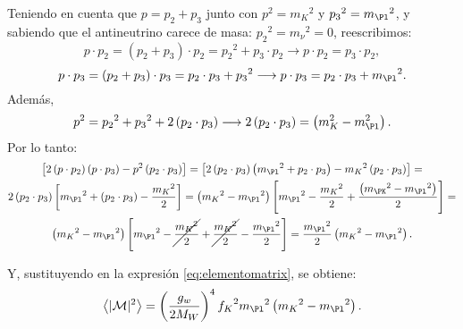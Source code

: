 Teniendo en cuenta que $p=p_{2}+p_{3}$ junto con $p^2={m_K}^2$ y ${p_3}^2={m_{\Pl}}^2$, y sabiendo que el antineutrino carece de masa: ${p_2}^2={m_{\nu}}^2=0$, reescribimos:
\begin{equation}
p \cdot p_{2} = \left( p_{2}+ p_{3}\right) \cdot p_{2} = {p_2}^{2}+ p_{3} \cdot p_{2} \longrightarrow p\cdot p_{2}= p_{3} \cdot p_{2} ,
\end{equation}
\begin{equation}
p \cdot p_{3}=\left( p_{2}+ p_{3}\right) \cdot p_{3} = p_{2} \cdot p_{3}+ {p_{3}}^2 \longrightarrow p \cdot p_{3} = p_{2} \cdot p_{3}+{m_{\Pl}}^2 .
\end{equation}
Además,
\begin{equation}
p^{2}={p_{2}}^{2}+{p_3}^{2}+2\left( p_{2} \cdot p_{3}\right) \longrightarrow 2\left( p_{2} \cdot p_{3}\right)=\left( m_{K}^{2}-m_{\Pl}^{2}\right) .
\end{equation}
Por lo tanto:
\begin{multline}
\left[ 2\left( p\cdot p_{2}\right) \left( p\cdot p_{3}\right) -p^{2}\left( p_{2}\cdot p_{3}\right) \right] = \left[ 2\left( p_{2}\cdot p_{3}\right) \left( {m_{\Pl}}^{2}+p_{2}\cdot p_{3}\right) -{m_{K}}^{2}\left( p_{2}\cdot p_{3}\right) \right] = \\ 2\left( p_{2} \cdot p_{3}\right) \left[ {m_{\Pl}}^{2}+\left( p_{2}\cdot p_{3}\right) -\dfrac{{m_K}^{2}}{2}\right] = \left({m_{K}}^{2}-{m_{\Pl}}^{2}\right) \left[{m_{\Pl}}^{2}-\dfrac{{m_K}^{2}}{2}+\dfrac{\left({m_{\PK}}^{2}-{m_{\Pl}}^{2}\right) }{2}\right] =\\ \left({m_{K}}^{2}-{m_{\Pl}}^{2}\right) \left[{m_{\Pl}}^{2}-\cancel{\dfrac{{m_{K}}^{2}}{2}}+\cancel{\dfrac{{m_{K}}^{2}}{2}}-\dfrac{{m_{\Pl}}^{2}}{2}\right] =\dfrac{{m_{\Pl}}^{2}}{2}\left( {m_{K}}^{2}-{m_{\Pl}}^{2}\right) .
\end{multline}

Y, sustituyendo en la expresión \ref{eq:elementomatrix}, se obtiene:
\begin{equation}
\left\langle |\mathcal{M}|^{2}\right\rangle=\left( \dfrac{g_w}{2M_W}\right)^{4} {f_K}^2 {m_{\Pl}}^{2}\left( {m_{K}}^{2}-{m_{\Pl}}^{2}\right) .\label{eq:averageM}
\end{equation}